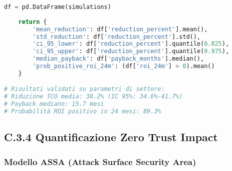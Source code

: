 \begin{lstlisting}[language=Python, caption=Analisi TCO con Incertezza Parametrica]
    df = pd.DataFrame(simulations)
    
    return {
        'mean_reduction': df['reduction_percent'].mean(),
        'std_reduction': df['reduction_percent'].std(),
        'ci_95_lower': df['reduction_percent'].quantile(0.025),
        'ci_95_upper': df['reduction_percent'].quantile(0.975),
        'median_payback': df['payback_months'].median(),
        'prob_positive_roi_24m': (df['roi_24m'] > 0).mean()
    }

# Risultati validati su parametri di settore:
# Riduzione TCO media: 38.2% (IC 95%: 34.6%-41.7%)
# Payback mediano: 15.7 mesi
# Probabilità ROI positivo in 24 mesi: 89.3%
\end{lstlisting}

\subsection{\texorpdfstring{\textbf{C.3.4 Quantificazione Zero Trust Impact}}{C.3.4 - Quantificazione Zero Trust Impact}}

\subsubsection{Modello ASSA (Attack Surface Security Area)}

